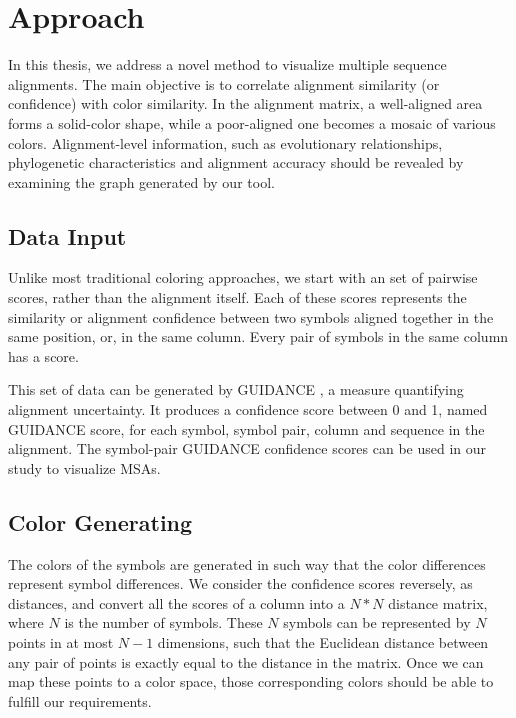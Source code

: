 \chapter{Approach}\label{chap:Approach}

In this thesis, we address a novel method to visualize multiple sequence alignments. The main objective is to correlate alignment similarity (or confidence) with color similarity. In the alignment matrix, a well-aligned area forms a solid-color shape, while a poor-aligned one becomes a mosaic of various colors. Alignment-level information, such as evolutionary relationships, phylogenetic characteristics and alignment accuracy should be revealed by examining the graph generated by our tool.

\section{Data Input}

Unlike most traditional coloring approaches, we start with an set of pairwise scores, rather than the alignment itself. Each of these scores represents the similarity or alignment confidence between two symbols aligned together in the same position, or, in the same column. Every pair of symbols in the same column has a score.

This set of data can be generated by GUIDANCE \cite{Penn:2010aa,Penn:2010ab}, a measure quantifying alignment uncertainty. It produces a confidence score between 0 and 1, named GUIDANCE score, for each symbol, symbol pair, column and sequence in the alignment. The symbol-pair GUIDANCE confidence scores can be used in our study to visualize MSAs.

\section{Color Generating}

The colors of the symbols are generated in such way that the color differences represent symbol differences. We consider the confidence scores reversely, as distances, and convert all the scores of a column into a $N*N$ distance matrix, where $N$ is the number of symbols. These $N$ symbols can be represented by $N$ points in at most $N-1$ dimensions, such that the Euclidean distance between any pair of points is exactly equal to the distance in the matrix. Once we can map these points to a color space, those corresponding colors should be able to fulfill our requirements.

